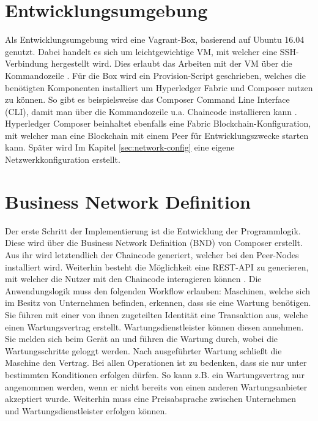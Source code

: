 \section{Entwicklungsumgebung}
Als Entwicklungsumgebung wird eine Vagrant-Box, basierend auf Ubuntu 16.04 genutzt. Dabei handelt es sich um leichtgewichtige VM, mit welcher eine SSH-Verbindung hergestellt wird. Dies erlaubt das Arbeiten mit der VM über die Kommandozeile \cite{VagrantHashiCorp}. Für die Box wird ein Provision-Script geschrieben, welches die benötigten Komponenten installiert um Hyperledger Fabric und Composer nutzen zu können. So gibt es beispielsweise das Composer Command Line Interface (CLI), damit man über die Kommandozeile u.a. Chaincode installieren kann \cite{DevelopmentEnvironmentHyperledger}. Hyperledger Composer beinhaltet ebenfalls eine Fabric Blockchain-Konfiguration, mit welcher man eine Blockchain mit einem Peer für Entwicklungszwecke starten kann. Später wird Im Kapitel \ref{sec:network-config} eine eigene Netzwerkkonfiguration erstellt.

\section{Business Network Definition}
Der erste Schritt der Implementierung ist die Entwicklung der Programmlogik. Diese wird über die Business Network Definition (BND) von Composer erstellt. Aus ihr wird letztendlich der Chaincode generiert, welcher bei den Peer-Nodes installiert wird. Weiterhin besteht die Möglichkeit eine REST-API zu generieren, mit welcher die Nutzer mit den Chaincode interagieren können \cite{DeveloperTutorialHyperledger}. Die Anwendungslogik muss den folgenden Workflow erlauben: Maschinen, welche sich im Besitz von Unternehmen befinden, erkennen, dass sie eine Wartung benötigen. Sie führen mit einer von ihnen zugeteilten Identität eine Transaktion aus, welche einen Wartungsvertrag erstellt. Wartungsdienstleister können diesen annehmen. Sie melden sich beim Gerät an und führen die Wartung durch, wobei die Wartungsschritte geloggt werden. Nach ausgeführter Wartung schließt die Maschine den Vertrag. Bei allen Operationen ist zu bedenken, dass sie nur unter bestimmten Konditionen erfolgen dürfen. So kann z.B. ein Wartungsvertrag nur angenommen werden, wenn er nicht bereits von einen anderen Wartungsanbieter akzeptiert wurde. Weiterhin muss eine Preisabsprache zwischen Unternehmen und Wartungsdienstleister erfolgen können. 

